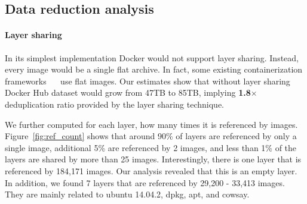 \subsection{Data reduction analysis} 
\label{sec:dedup_ratio}

\paragraph{Layer sharing}

In its simplest implementation Docker would not support layer sharing.
%
Instead, every image would be a single flat archive.
%
In fact, some existing containerization frameworks
~\cite{singularity}~\cite{openvz} 
%
%
%
%
use flat images.
%
Our estimates show that without layer sharing Docker Hub dataset would grow
from 47TB to 85TB, implying \textbf{1.8$\times$} deduplication ratio provided
by the layer sharing technique.
 
We further computed for each layer, how many times it is referenced by images.
%
Figure~\ref{fig:ref_count} shows that around 90\% of layers are referenced by
only a single image, additional 5\% are referenced by 2 images, and less than
1\% of the layers are shared by more than 25 images.
%
Interestingly, there is one layer that is referenced by 184,171 images.  Our
analysis revealed that this is an empty layer. 
%
In addition, we found 7 layers that are referenced by 29,200 - 33,413 images.
They are mainly related to ubuntu 14.04.2, dpkg, apt, and cowsay. 
%
%
%

